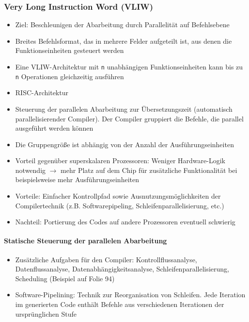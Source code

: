 \subsubsection{Very Long Instruction Word (VLIW)}
\begin{itemize}
	\item Ziel: Beschleunigen der Abarbeitung durch Parallelität auf Befehlsebene
	\item Breites Befehlsformat, das in mehrere Felder aufgeteilt ist, aus denen die Funktionseinheiten gesteuert werden
	\item Eine VLIW-Architektur mit \texttt{n} unabhängigen Funktionseinheiten kann bis zu \texttt{n} Operationen gleichzeitig ausführen
	\item RISC-Architektur
	\item Steuerung der parallelen Abarbeitung zur Übersetzungszeit (automatisch parallelisierender Compiler). Der Compiler gruppiert die Befehle, die parallel ausgeführt werden können
	\item Die Gruppengröße ist abhängig von der Anzahl der Ausführungseinheiten
	\item Vorteil gegenüber superskalaren Prozessoren: Weniger Hardware-Logik notwendig \(\rightarrow\) mehr Platz auf dem Chip für zusätzliche Funktionalität bei beispielsweise mehr Ausführungseinheiten
	\item Vorteile: Einfacher Kontrollpfad sowie Ausnutzungsmöglichkeiten der Compilertechnik (z.B. Softwarepipeling, Schleifenparallelisierung, etc.)
	\item Nachteil: Portierung des Codes auf andere Prozessoren eventuell schwierig
\end{itemize}

\paragraph{Statische Steuerung der parallelen Abarbeitung}
\begin{itemize}
	\item Zusätzliche Aufgaben für den Compiler: Kontrollflussanalyse, Datenflussanalyse, Datenabhängigkeitsanalyse, Schleifenparallelisierung, Scheduling (Beispiel auf Folie 94)
	\item Software-Pipelining: Technik zur Reorganisation von Schleifen. Jede Iteration im generierten Code enthält Befehle aus verschiedenen Iterationen der ursprünglichen Stufe
\end{itemize}

